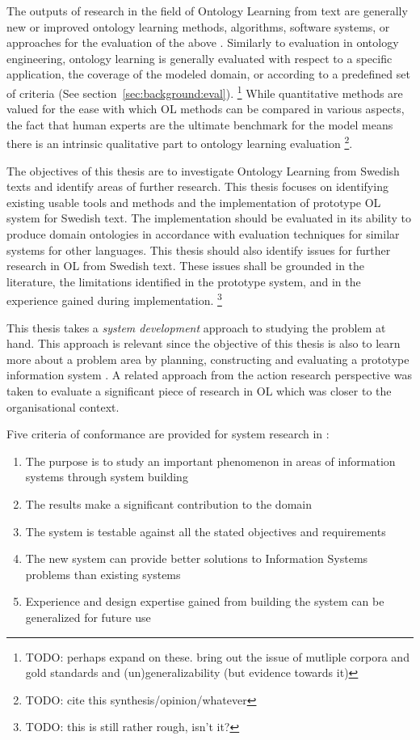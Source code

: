 \documentclass[a4paper]{report}
\newcommand{\todo}[1]{\footnote{{\color{red} TODO: #1}}}
\begin{document}
The outputs of research in the field of Ontology Learning from text are generally new or improved ontology learning methods, algorithms, software systems, or approaches for the evaluation of the above \cite{Wong11Survey}.
Similarly to evaluation in ontology engineering, ontology learning is generally evaluated with respect to a specific application, the coverage of the modeled domain, or according to a predefined set of criteria\cite{Wong11Survey} (See section~\ref{sec:background:eval}).
\todo{perhaps expand on these. bring out the issue of mutliple corpora and gold standards and (un)generalizability (but evidence towards it)}
While quantitative methods are valued for the ease with which OL methods can be compared in various aspects, the fact that human experts are the ultimate benchmark for the model means there is an intrinsic qualitative part to ontology learning evaluation \todo{cite this synthesis/opinion/whatever}.

The objectives of this thesis are to investigate Ontology Learning from Swedish texts and identify areas of further research.
This thesis focuses on identifying existing usable tools and methods and the implementation of prototype OL system for Swedish text.
The implementation should be evaluated in its ability to produce domain ontologies in accordance with evaluation techniques for similar systems for other languages.
This thesis should also identify issues for further research in OL from Swedish text.
These issues shall be grounded in the literature, the limitations identified in the prototype system, and in the experience gained during implementation. \todo{this is still rather rough, isn't it?}

This thesis takes a \emph{system development} approach to studying the problem at hand.
This approach is relevant since the objective of this thesis is also to learn more about a problem area by planning, constructing and evaluating a prototype information system \cite{NunamakerChen90SDResearch}.
A related approach from the action research perspective\cite{BursteinGregor99SDResearch} was taken to evaluate a significant piece of research in OL which was closer to the organisational context\cite{Blomqvist09Thesis}.

Five criteria of conformance are provided for system research in \cite{NunamakerChen90SDResearch}:
\begin{enumerate}
\item The purpose is to study an important phenomenon in areas of information systems through
system building
\item The results make a significant contribution to the domain
\item The system is testable against all the stated objectives and requirements
\item The new system can provide better solutions to Information Systems problems than existing systems
\item Experience and design expertise gained from building the system can be generalized for future use
\end{enumerate}
\end{document}
